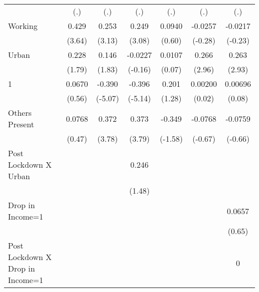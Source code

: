 \begin{table}[htbp]
\begin{tabular}{l*{6}{c}}
                    &         (.)         &         (.)         &         (.)         &         (.)         &         (.)         &         (.)         \\
[1em]
Working             &       0.429\sym{***}&       0.253\sym{**} &       0.249\sym{**} &      0.0940         &     -0.0257         &     -0.0217         \\
                    &      (3.64)         &      (3.13)         &      (3.08)         &      (0.60)         &     (-0.28)         &     (-0.23)         \\
[1em]
Urban               &       0.228         &       0.146         &     -0.0227         &      0.0107         &       0.266\sym{**} &       0.263\sym{**} \\
                    &      (1.79)         &      (1.83)         &     (-0.16)         &      (0.07)         &      (2.96)         &      (2.93)         \\
[1em]
1                   &      0.0670         &      -0.390\sym{***}&      -0.396\sym{***}&       0.201         &     0.00200         &     0.00696         \\
                    &      (0.56)         &     (-5.07)         &     (-5.14)         &      (1.28)         &      (0.02)         &      (0.08)         \\
[1em]
Others Present      &      0.0768         &       0.372\sym{***}&       0.373\sym{***}&      -0.349         &     -0.0768         &     -0.0759         \\
                    &      (0.47)         &      (3.78)         &      (3.79)         &     (-1.58)         &     (-0.67)         &     (-0.66)         \\
[1em]
Post Lockdown X Urban&                     &                     &       0.246         &                     &                     &                     \\
                    &                     &                     &      (1.48)         &                     &                     &                     \\
[1em]
Drop in Income=1    &                     &                     &                     &                     &                     &      0.0657         \\
                    &                     &                     &                     &                     &                     &      (0.65)         \\
[1em]
Post Lockdown X Drop in Income=1&                     &                     &                     &                     &                     &           0         \\

\end{tabular}
\end{table}

